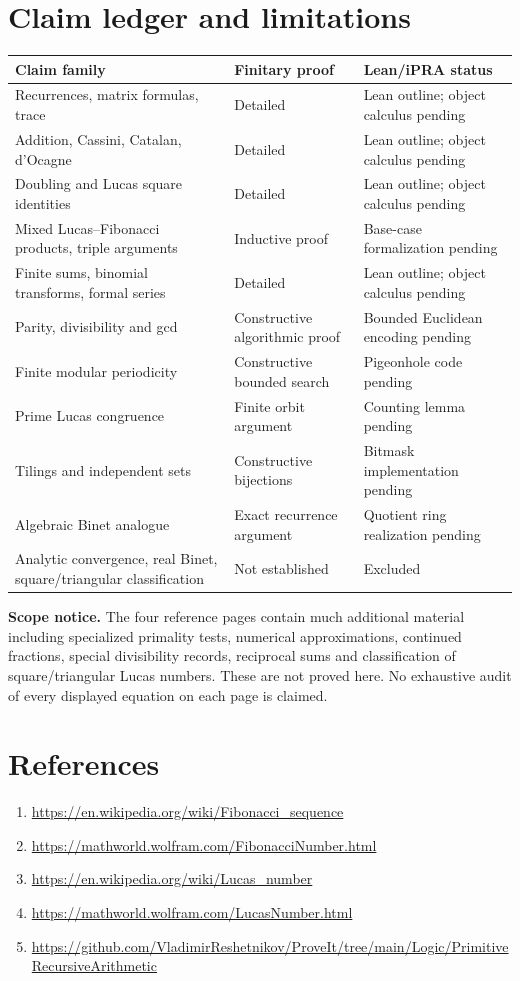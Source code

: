 \documentclass[11pt]{article}
\begin{document}
\section{Claim ledger and limitations}
\begin{longtable}{p{.53\linewidth}p{.16\linewidth}p{.23\linewidth}}\toprule Claim family & Finitary proof & Lean/iPRA status\\\midrule\endhead
Recurrences, matrix formulas, trace & Detailed & Lean outline; object calculus pending\\
Addition, Cassini, Catalan, d'Ocagne & Detailed & Lean outline; object calculus pending\\
Doubling and Lucas square identities & Detailed & Lean outline; object calculus pending\\
Mixed Lucas--Fibonacci products, triple arguments & Inductive proof & Base-case formalization pending\\
Finite sums, binomial transforms, formal series & Detailed & Lean outline; object calculus pending\\
Parity, divisibility and gcd & Constructive algorithmic proof & Bounded Euclidean encoding pending\\
Finite modular periodicity & Constructive bounded search & Pigeonhole code pending\\
Prime Lucas congruence & Finite orbit argument & Counting lemma pending\\
Tilings and independent sets & Constructive bijections & Bitmask implementation pending\\
Algebraic Binet analogue & Exact recurrence argument & Quotient ring realization pending\\
Analytic convergence, real Binet, square/triangular classification & Not established & Excluded\\\bottomrule
\end{longtable}
\noindent\textbf{Scope notice.} The four reference pages contain much additional material including specialized primality tests, numerical approximations, continued fractions, special divisibility records, reciprocal sums and classification of square/triangular Lucas numbers. These are not proved here. No exhaustive audit of every displayed equation on each page is claimed.
\section{References}
\begin{enumerate}
\item \url{https://en.wikipedia.org/wiki/Fibonacci_sequence}
\item \url{https://mathworld.wolfram.com/FibonacciNumber.html}
\item \url{https://en.wikipedia.org/wiki/Lucas_number}
\item \url{https://mathworld.wolfram.com/LucasNumber.html}
\item \url{https://github.com/VladimirReshetnikov/ProveIt/tree/main/Logic/PrimitiveRecursiveArithmetic}
\end{enumerate}
\end{document}
